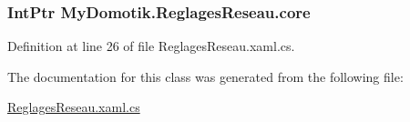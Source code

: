 \subsubsection[{\texorpdfstring{core}{core}}]{\setlength{\rightskip}{0pt plus 5cm}Int\+Ptr My\+Domotik.\+Reglages\+Reseau.\+core\hspace{0.3cm}{\ttfamily [private]}}\hypertarget{class_my_domotik_1_1_reglages_reseau_a54bd091d62d190419ec8061307d0bc9e}{}\label{class_my_domotik_1_1_reglages_reseau_a54bd091d62d190419ec8061307d0bc9e}


Definition at line 26 of file Reglages\+Reseau.\+xaml.\+cs.



The documentation for this class was generated from the following file\+:\begin{DoxyCompactItemize}
\item 
\hyperlink{_reglages_reseau_8xaml_8cs}{Reglages\+Reseau.\+xaml.\+cs}\end{DoxyCompactItemize}
